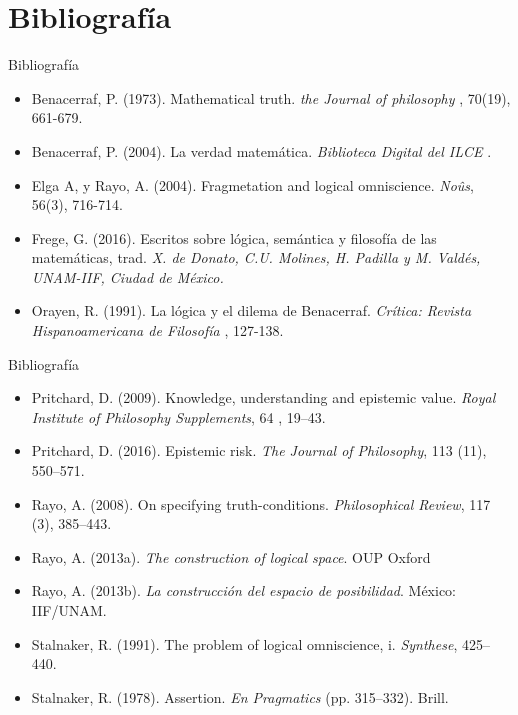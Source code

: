 \documentclass{beamer}
\begin{document}
\section{Bibliograf\'ia}
    \begin{frame}{Bibliografía}
      \begin{itemize}
        \item Benacerraf, P. (1973). Mathematical truth. \textit{
            the Journal of philosophy
        }, 70(19), 661-679.
        \item Benacerraf, P. (2004). La verdad matemática. \textit{
            Biblioteca Digital del ILCE
        }. 
        \item Elga A, y Rayo, A. (2004). Fragmetation and logical 
        omniscience. \textit{No\^us}, 56(3), 716-714.
        \item Frege, G. (2016). Escritos sobre lógica, semántica y 
        filosofía de las matemáticas, trad. \textit{X. de Donato, 
        C.U. Molines, H. Padilla y M. Valdés, UNAM-IIF, Ciudad de México.}  
        \item Orayen, R. (1991). La lógica y el dilema de Benacerraf. \textit{
            Crítica: Revista Hispanoamericana de Filosofía
        }, 127-138.
      \end{itemize}
    \end{frame}
      \begin{frame}{Bibliografía}
        \begin{itemize}
            \item Pritchard, D. (2009). Knowledge, understanding and epistemic 
        value. \textit{Royal Institute of Philosophy Supplements}, 64 , 19–43.
        \item Pritchard, D. (2016). Epistemic risk. \textit{The Journal of 
        Philosophy}, 113 (11), 550–571.
        \item Rayo, A. (2008). On specifying truth-conditions. \textit{Philosophical 
        Review}, 117 (3), 385–443.
        \item Rayo, A. (2013a). \textit{The construction of logical space}. OUP Oxford
        \item Rayo, A. (2013b). \textit{La construcción del espacio de posibilidad}. 
        México: IIF/UNAM.
        \item Stalnaker, R. (1991). The problem of logical omniscience, i. 
        \textit{Synthese}, 425–440.
        \item Stalnaker, R. (1978). Assertion. \textit{En Pragmatics} (pp. 315–332). 
        Brill.
        \end{itemize}
    \end{frame}
\end{document}
